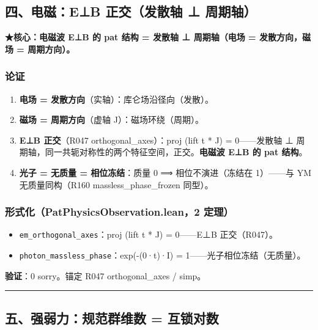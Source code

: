 \documentclass[
]{article}
\providecommand{\tightlist}{%
 \setlength{\itemsep}{0pt}\setlength{\parskip}{0pt}}
\begin{document}
\subsection{四、电磁：E⊥B 正交（发散轴 ⊥
周期轴）}\label{ux56dbux7535ux78c1eb-ux6b63ux4ea4ux53d1ux6563ux8f74-ux5468ux671fux8f74}

\textbf{★核心：电磁波 E⊥B 的 pat 结构 = 发散轴 ⊥ 周期轴（电场 =
发散方向，磁场 = 周期方向）。}

\subsubsection{论证}\label{ux8bbaux8bc1-3}

\begin{enumerate}
\def\labelenumi{\arabic{enumi}.}
\tightlist
\item
 \textbf{电场 = 发散方向}（实轴）：库仑场沿径向（发散）。
\item
 \textbf{磁场 = 周期方向}（虚轴 J）：磁场环绕（周期）。
\item
 \textbf{E⊥B 正交}（R047 orthogonal\_axes）：proj (lift t * J) =
 0------发散轴 ⊥
 周期轴，同一共轭对称性的两个特征空间，正交。\textbf{电磁波 E⊥B 的 pat
 结构}。
\item
 \textbf{光子 = 无质量 = 相位冻结}：质量 0 ⟹ 相位不演进（冻结在
 1）------与 YM 无质量同构（R160 massless\_phase\_frozen 同型）。
\end{enumerate}

\subsubsection{形式化（PatPhysicsObservation.lean，2
定理）}\label{ux5f62ux5f0fux5316patphysicsobservation.lean2-ux5b9aux7406-1}

\begin{itemize}
\tightlist
\item
 \texttt{em\_orthogonal\_axes}：proj (lift t * J) = 0------E⊥B
 正交（R047）。
\item
 \texttt{photon\_massless\_phase}：exp(-(0·t)·I) =
 1------光子相位冻结（无质量）。
\end{itemize}

\textbf{验证}：0 sorry。锚定 R047 orthogonal\_axes / simp。

\begin{center}\rule{0.5\linewidth}{0.5pt}\end{center}

\subsection{五、强弱力：规范群维数 =
互锁对数}\label{ux4e94ux5f3aux5f31ux529bux89c4ux8303ux7fa4ux7ef4ux6570-ux4e92ux9501ux5bf9ux6570}
\end{document}

